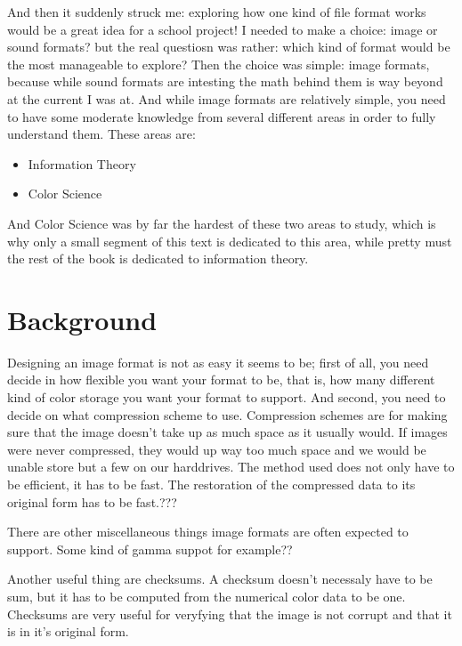 And then it suddenly struck me: exploring how one kind of file format
works would be a great idea for a school project! I needed to make a
choice: image or sound formats? but the real questiosn was rather:
which kind of format would be the most manageable to explore? Then the
choice was simple: image formats, because while sound formats are
intesting the math behind them is way beyond at the current I was
at. And while image formats are relatively simple, you need to have
some moderate knowledge from several different areas in order to fully
understand them. These areas are:

\begin{itemize}
\item Information Theory
\item Color Science
\end{itemize}

And Color Science was by far the hardest of these two areas to study,
which is why only a small segment of this text is dedicated to this
area, while pretty must the rest of the book is dedicated to information
theory.

\section{Background}

Designing an image format is not as easy it seems to be; first of all,
you need decide in how flexible you want your format to be, that is,
how many different kind of color storage you want your format to
support. And second, you need to decide on what compression scheme to
use. Compression schemes are for making sure that the image doesn't
take up as much space as it usually would. If images were never
compressed, they would up way too much space and we would be unable
store but a few on our harddrives. The method used does not only have
to be efficient, it has to be fast. The restoration of the compressed
data to its original form has to be fast.???

There are other miscellaneous things image formats are often expected
to support. Some kind of gamma suppot for example??

Another useful thing are checksums. A checksum doesn't necessaly have
to be sum, but it has to be computed from the numerical color data to
be one. Checksums are very useful for veryfying that the image is not
corrupt and that it is in it's original form.
